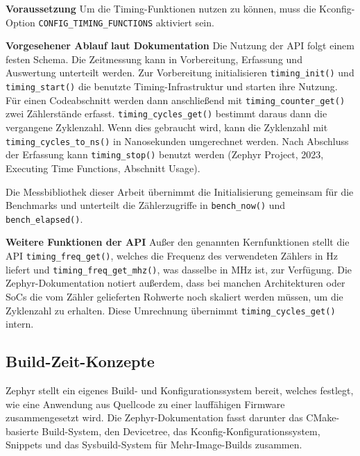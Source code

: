 \textbf{Voraussetzung} Um die Timing-Funktionen nutzen zu k{\"o}nnen, muss die Kconfig-Option \lstinline[style=fileinline]|CONFIG_TIMING_FUNCTIONS| aktiviert sein.

\textbf{Vorgesehener Ablauf laut Dokumentation} Die Nutzung der API folgt einem festen Schema. Die Zeitmessung kann in Vorbereitung, Erfassung und Auswertung unterteilt werden. Zur Vorbereitung initialisieren \lstinline[style=fileinline]|timing_init()| und \lstinline[style=fileinline]|timing_start()| die benutzte Timing-Infrastruktur und starten ihre Nutzung. F{\"u}r einen Codeabschnitt werden dann anschlie{\ss}end mit \lstinline[style=fileinline]|timing_counter_get()| zwei Z{\"a}hlerst{\"a}nde erfasst. \lstinline[style=fileinline]|timing_cycles_get()| bestimmt daraus dann die vergangene Zyklenzahl. Wenn dies gebraucht wird, kann die Zyklenzahl mit \lstinline[style=fileinline]|timing_cycles_to_ns()| in Nanosekunden umgerechnet werden. Nach Abschluss der Erfassung kann \lstinline[style=fileinline]|timing_stop()| benutzt werden (Zephyr Project, 2023, \glqq{}Executing Time Functions\grqq{}, Abschnitt \glqq{}Usage\grqq{}).

Die Messbibliothek dieser Arbeit {\"u}bernimmt die Initialisierung gemeinsam f{\"u}r die Benchmarks und unterteilt die Z{\"a}hlerzugriffe in \lstinline[style=fileinline]|bench_now()| und \lstinline[style=fileinline]|bench_elapsed()|.

\textbf{Weitere Funktionen der API} Au{\ss}er den genannten Kernfunktionen stellt die API \lstinline[style=fileinline]|timing_freq_get()|, welches die Frequenz des verwendeten Z{\"a}hlers in Hz liefert und \lstinline[style=fileinline]|timing_freq_get_mhz()|, was dasselbe in MHz ist, zur Verf{\"u}gung. Die Zephyr-Dokumentation notiert au{\ss}erdem, dass bei manchen Architekturen oder SoCs die vom Z{\"a}hler gelieferten Rohwerte noch skaliert werden m{\"u}ssen, um die Zyklenzahl zu erhalten. Diese Umrechnung {\"u}bernimmt \lstinline[style=fileinline]|timing_cycles_get()| intern.

\subsection{Build-Zeit-Konzepte}
Zephyr stellt ein eigenes Build- und Konfigurationssystem bereit, welches festlegt, wie eine Anwendung aus Quellcode zu einer lauff{\"a}higen Firmware zusammengesetzt wird. Die Zephyr-Dokumentation fasst darunter das CMake-basierte Build-System, den Devicetree, das Kconfig-Konfigurationssystem, Snippets und das Sysbuild-System f{\"u}r Mehr-Image-Builds zusammen.

